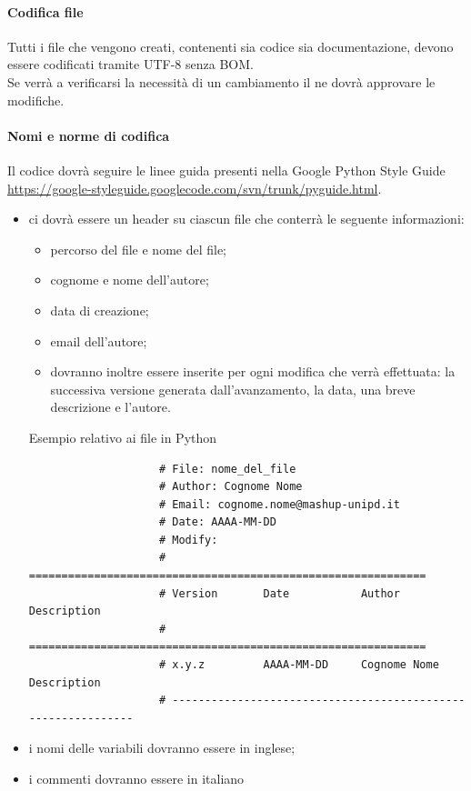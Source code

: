 			\paragraph{Codifica file} %
			\label{par:codifica}
			Tutti i file che vengono creati, contenenti sia codice sia documentazione, devono essere codificati tramite UTF-8 senza BOM. \\
			Se verrà a verificarsi la necessità di un cambiamento il \roleProjectManager{} ne dovrà approvare le modifiche.
			
			\paragraph{Nomi e norme di codifica} %
			\label{par:nomi_e_norme_di_codifica}
			Il codice dovrà seguire le linee guida	presenti nella Google Python Style Guide \url{https://google-styleguide.googlecode.com/svn/trunk/pyguide.html}.	 \\
			 
				\begin{itemize}
					\item ci dovrà essere un header su ciascun file che conterrà le seguente informazioni:
						\begin{itemize}
							\item percorso del file e nome del file;
							\item cognome e nome dell'autore;
							\item data di creazione;
							\item email dell'autore;
							\item dovranno inoltre essere inserite per ogni modifica che verrà effettuata: la successiva versione generata dall'avanzamento, la data, una breve descrizione e l'autore.
						\end{itemize}
					\noindent
Esempio relativo ai file in Python
					\begin{verbatim}
					# File: nome_del_file
					# Author: Cognome Nome
					# Email: cognome.nome@mashup-unipd.it
					# Date: AAAA-MM-DD
					# Modify:
					# =============================================================
					# Version       Date           Author              Description  
					# =============================================================
					# x.y.z         AAAA-MM-DD     Cognome Nome        Description
					# -------------------------------------------------------------
					\end{verbatim}
					\item i nomi delle variabili dovranno essere in inglese;
					\item i commenti dovranno essere in italiano
				\end{itemize}
			
